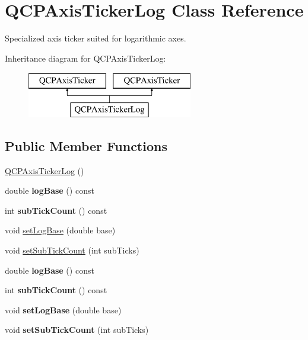 \hypertarget{class_q_c_p_axis_ticker_log}{}\section{Q\+C\+P\+Axis\+Ticker\+Log Class Reference}
\label{class_q_c_p_axis_ticker_log}


Specialized axis ticker suited for logarithmic axes.  


Inheritance diagram for Q\+C\+P\+Axis\+Ticker\+Log\+:\begin{figure}[H]
\begin{center}
\leavevmode
\includegraphics[height=2.000000cm]{class_q_c_p_axis_ticker_log}
\end{center}
\end{figure}
\subsection*{Public Member Functions}
\begin{DoxyCompactItemize}
\item 
\hyperlink{class_q_c_p_axis_ticker_log_af3cb86ea5eef2023c0b96b5260c4cbdf}{Q\+C\+P\+Axis\+Ticker\+Log} ()
\item 
\mbox{\label{class_q_c_p_axis_ticker_log_a841a97f2b6850ff1ef3aa73e89d94775}} 
double {\bfseries log\+Base} () const
\item 
\mbox{\label{class_q_c_p_axis_ticker_log_aebe43661977364fc1fd220fa1ae36a10}} 
int {\bfseries sub\+Tick\+Count} () const
\item 
void \hyperlink{class_q_c_p_axis_ticker_log_ac6e3b4e03baea3816f898869ab9751ef}{set\+Log\+Base} (double base)
\item 
void \hyperlink{class_q_c_p_axis_ticker_log_ad51989c798c0cfd50936d77aac57c56a}{set\+Sub\+Tick\+Count} (int sub\+Ticks)
\item 
\mbox{\label{class_q_c_p_axis_ticker_log_a841a97f2b6850ff1ef3aa73e89d94775}} 
double {\bfseries log\+Base} () const
\item 
\mbox{\label{class_q_c_p_axis_ticker_log_aebe43661977364fc1fd220fa1ae36a10}} 
int {\bfseries sub\+Tick\+Count} () const
\item 
\mbox{\label{class_q_c_p_axis_ticker_log_ac6e3b4e03baea3816f898869ab9751ef}} 
void {\bfseries set\+Log\+Base} (double base)
\item 
\mbox{\label{class_q_c_p_axis_ticker_log_ad51989c798c0cfd50936d77aac57c56a}} 
void {\bfseries set\+Sub\+Tick\+Count} (int sub\+Ticks)
\end{DoxyCompactItemize}

